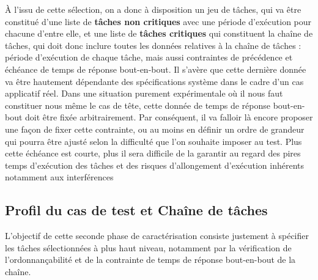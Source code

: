 \documentclass[french, a4paper, 11pt, twoside, pdftex]{StyleThese}
\begin{document}
    		À l'issu de cette sélection, on a donc à disposition un jeu de tâches, qui va être constitué d'une liste de \textbf{tâches non critiques} avec une période d'exécution pour chacune d'entre elle, et une liste de \textbf{tâches critiques} qui constituent la chaîne de tâches, qui doit donc inclure toutes les données relatives à la chaîne de tâches : période d'exécution de chaque tâche, mais aussi contraintes de précédence et échéance de temps de réponse bout-en-bout. 
    		Il s'avère que cette dernière donnée va être hautement dépendante des spécifications système dans le cadre d'un cas applicatif réel. Dans une situation purement expérimentale où il nous faut constituer nous même le cas de tête, cette donnée de temps de réponse bout-en-bout doit être fixée arbitrairement. Par conséquent, il va falloir là encore proposer une façon de fixer cette contrainte, ou au moins en définir un ordre de grandeur qui pourra être ajusté selon la difficulté que l'on souhaite imposer au test. Plus cette échéance est courte, plus il sera difficile de la garantir au regard des pires temps d'exécution des tâches et des risques d'allongement d'exécution inhérents notamment aux interférences
    		
                    
    \subsection{Profil du cas de test et Chaîne de tâches}
    
L'objectif de cette seconde phase de caractérisation consiste justement à spécifier les tâches sélectionnées à plus haut niveau, notamment par la vérification de l'ordonnançabilité et de la contrainte de temps de réponse bout-en-bout de la chaîne.
\end{document}
